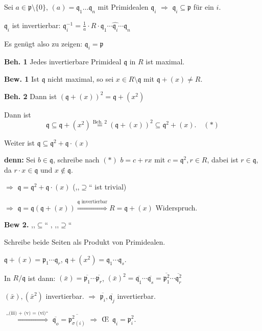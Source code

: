 \begin{Bew}
\begin{description}
Sei $a \in \mathfrak{p}\setminus \{0\}$, $(a) = \mathfrak{q}_1 \ldots \mathfrak{q}_n$ mit Primidealen $\mathfrak{q}_i$ $\Rightarrow$ $\mathfrak{q}_i \subseteq \mathfrak{p}$ f\"ur ein $i$.

$\mathfrak{q}_i$ ist invertierbar: $\mathfrak{q}_i^{-1} = \frac{1}{a} \cdot R \cdot \mathfrak{q}_1 \cdots \widehat{\mathfrak{q}_i} \cdots \mathfrak{q}_n$

Es gen\"ugt also zu zeigen: $\mathfrak{q}_i = \mathfrak{p}$

\textbf{Beh. 1} Jedes invertierbare Primideal $\mathfrak{q}$ in $R$ ist maximal.

\textbf{Bew. 1}
Ist $\mathfrak{q}$ nicht maximal, so sei $x \in R \setminus \mathfrak{q}$ mit $\mathfrak{q} + (x) \neq R$.

\textbf{Beh. 2} Dann ist $(\mathfrak{q} + (x))^2 = \mathfrak{q} + (x^2)$

Dann ist
\[
\mathfrak{q} \subseteq \mathfrak{q} + (x^2) \overset{\text{Beh. 2}}{=}
(\mathfrak{q} + (x))^2 \subseteq \mathfrak{q}^2 + (x).\quad(\ast)
\]

Weiter ist $\mathfrak{q} \subseteq \mathfrak{q}^2 + \mathfrak{q} \cdot (x)$

\textbf{denn:} Sei $b \in \mathfrak{q}$, schreibe nach $(\ast)$ $b = c + r x$ mit $c = \mathfrak{q}^2, r \in R$, dabei ist $r \in \mathfrak{q}$, da $r \cdot x \in \mathfrak{q}$ und $x \notin \mathfrak{q}$.

$\Rightarrow$ $\mathfrak{q} = \mathfrak{q}^2 + \mathfrak{q} \cdot (x)$ (,,$\supseteq$`` ist trivial)

$\Rightarrow$ $\mathfrak{q} = \mathfrak{q} (\mathfrak{q} + (x)) \overset{\mathfrak{q}\text{ invertierbar}}\Rightarrow R = \mathfrak{q} + (x)$ Widerspruch.

\textbf{Bew 2.} ,,$\subseteq$`` \chk, ,,$\supseteq$``

Schreibe beide Seiten als Produkt von Primidealen.

$\mathfrak{q} + (x) = \mathfrak{p}_1 \cdots \mathfrak{q}_r$, $\mathfrak{q} + (x^2) = \mathfrak{q}_1 \cdots \mathfrak{q}_s$.

In $R / \mathfrak{q}$ ist dann: $(\bar{x}) = \overline{\mathfrak{p}_1} \cdots \overline{\mathfrak{p}_r}$, $(\bar{x})^2 = \overline{\mathfrak{q}_1} \cdots \overline{\mathfrak{q}_s} = \overline{\mathfrak{p}_1^2} \cdots \overline{\mathfrak{q}_r^2}$

$(\bar{x}), (\bar{x}^2)$ invertierbar. $\Rightarrow$ $\overline{\mathfrak{p}_i}, \overline{\mathfrak{q}_j}$ invertierbar.

$\overset{\text{,,(iii) + (v) = (vi)``}}{\Rightarrow}$
$\overline{\mathfrak{q}_o} = \overline{\mathfrak{p}_{\sigma(i)}^2}$
$\Rightarrow$ \OE\  $\mathfrak{q}_i = \mathfrak{p}_i^2$.

\end{description}
\end{Bew}

